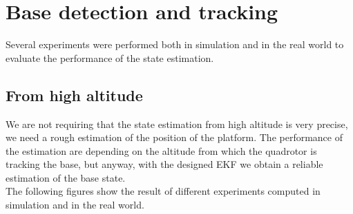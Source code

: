\section{Base detection and tracking}
Several experiments were performed both in simulation and in the real world to evaluate the performance of the state estimation.
\subsection{From high altitude}
We are not requiring that the state estimation from high altitude is very precise, we need a rough estimation of the position of the platform. The performance of the estimation are depending on the altitude from which the quadrotor is tracking the base, but anyway, with the designed  EKF we obtain a reliable estimation of the base state.\\
The following figures show the result of different experiments computed in simulation and in the real world.

